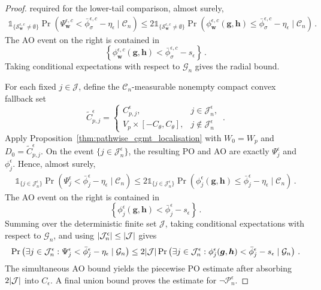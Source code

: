 \documentclass{article}
\makeatletter
\theoremstyle{definition}
\newcommand{\abs}[1]{%
	\ensuremath{%
		\if@display
		\left| #1 \right|
		\else
		\lvert #1 \rvert
		\fi
	}%
}
\newcommand*{\bb}{\boldsymbol}
\def\bw {\bb{w}}
\def\bh{\bb{h}}
\def\bg{\bb{g}}
\makeatother
\begin{document}
\begin{bibunit}
\begin{proof}
required for the lower-tail comparison, almost surely,
$$
\begin{aligned}
    \mathds{1}_{\{\mathcal S_{\bw}^{\epsilon,c}\neq\emptyset\}}
    \Pr\left(
        \Psi_{\bw}^{\epsilon,c}
        <
        \bar\phi_{\sigma}^{\epsilon,c}-\eta_\epsilon
        \mid
        \mathcal C_n
    \right)
  \leq
    2\mathds{1}_{\{\mathcal S_{\bw}^{\epsilon,c}\neq\emptyset\}}
    \Pr\left(
        \phi_{\bw}^{\epsilon,c}(\bg,\bh)
        \leq
        \bar\phi_{\sigma}^{\epsilon,c}-\eta_\epsilon
        \mid
        \mathcal C_n
    \right) \,.
\end{aligned}
$$
The AO event on the right is contained in
$$
    \left\{
        \phi_{\bw}^{\epsilon,c}(\bg,\bh)
        <
        \bar\phi_{\sigma}^{\epsilon,c}-s_\epsilon
    \right\} \,.
$$
Taking conditional expectations with respect to $\mathcal G_n$ gives the
radial bound.

For each fixed $j\in\mathcal J$, define the
$\mathcal C_n$-measurable nonempty compact convex fallback set 
$$
    \widetilde C_{p,j}^{\epsilon}
    =
    \begin{cases}
        C_{p,j}^{\epsilon},
        & j\in\mathcal J_n^\epsilon,\\
        V_p\times[-C_\theta,C_\theta],
        & j\notin\mathcal J_n^\epsilon
    \end{cases}\,.
$$
Apply Proposition~\ref{thm:pathwise_cgmt_localisation} with
$W_0=W_p$ and $D_0=\widetilde C_{p,j}^{\epsilon}$. On the event
$\{j\in\mathcal J_n^\epsilon\}$, the resulting PO and AO are exactly
$\Psi_j^\epsilon$ and $\phi_j^\epsilon$. Hence, almost surely,
$$
\begin{aligned}
    \mathds{1}_{\{j\in\mathcal J_n^\epsilon\}}
    \Pr\left(
        \Psi_j^\epsilon
        <
        \bar\phi_j^\epsilon-\eta_\epsilon
        \mid
        \mathcal C_n
    \right)
   \leq
    2\mathds{1}_{\{j\in\mathcal J_n^\epsilon\}}
    \Pr\left(
        \phi_j^\epsilon(\bg,\bh)
        \leq
        \bar\phi_j^\epsilon-\eta_\epsilon
        \mid
        \mathcal C_n
    \right) \,.
\end{aligned}
$$
The AO event on the right is contained in
$$
    \left\{
        \phi_j^\epsilon(\bg,\bh)
        <
        \bar\phi_j^\epsilon-s_\epsilon
    \right\} \,.
$$
Summing over the deterministic finite set $\mathcal J$, taking conditional
expectations with respect to $\mathcal G_n$, and using
$\abs{\mathcal J_n^\epsilon}\leq\abs{\mathcal J}$ gives
$$
\begin{aligned}
    \Pr\left(
        \exists j\in\mathcal J_n^\epsilon:
        \Psi_j^\epsilon
        <
        \bar\phi_j^\epsilon-\eta_\epsilon
        \mid
        \mathcal G_n
    \right)
  \leq
    2\abs{\mathcal J}
    \Pr\left(
        \exists j\in\mathcal J_n^\epsilon:
        \phi_j^\epsilon(\bg,\bh)
        <
        \bar\phi_j^\epsilon-s_\epsilon
        \mid
        \mathcal G_n
    \right) \,.
\end{aligned}
$$
The simultaneous AO bound yields the piecewise PO estimate after absorbing
$2\abs{\mathcal J}$ into $C_\epsilon$. A final union bound proves the
estimate for $\lnot\mathcal P_n^\epsilon$.
\end{proof}


\end{bibunit}
\end{document}
